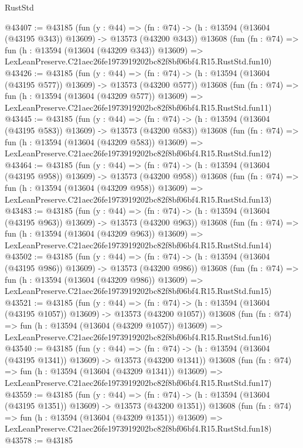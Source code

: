 \begin{lexlean}{RustStd}
\begin{coremodule}
@43407 := @43185
    (fun (y : @44) =>
    (fn : @74) -> (h : @13594 (@13604 (@43195 @343)) @13609) -> @13573 (@43200 @343))
    @13608
    (fun (fn : @74) =>
    fun (h : @13594 (@13604 (@43209 @343)) @13609) =>
    LexLeanPreserve.C21aec26fe1973919202bc82f8bf06bf4.R15.RustStd.fun10)
@43426 := @43185
    (fun (y : @44) =>
    (fn : @74) -> (h : @13594 (@13604 (@43195 @577)) @13609) -> @13573 (@43200 @577))
    @13608
    (fun (fn : @74) =>
    fun (h : @13594 (@13604 (@43209 @577)) @13609) =>
    LexLeanPreserve.C21aec26fe1973919202bc82f8bf06bf4.R15.RustStd.fun11)
@43445 := @43185
    (fun (y : @44) =>
    (fn : @74) -> (h : @13594 (@13604 (@43195 @583)) @13609) -> @13573 (@43200 @583))
    @13608
    (fun (fn : @74) =>
    fun (h : @13594 (@13604 (@43209 @583)) @13609) =>
    LexLeanPreserve.C21aec26fe1973919202bc82f8bf06bf4.R15.RustStd.fun12)
@43464 := @43185
    (fun (y : @44) =>
    (fn : @74) -> (h : @13594 (@13604 (@43195 @958)) @13609) -> @13573 (@43200 @958))
    @13608
    (fun (fn : @74) =>
    fun (h : @13594 (@13604 (@43209 @958)) @13609) =>
    LexLeanPreserve.C21aec26fe1973919202bc82f8bf06bf4.R15.RustStd.fun13)
@43483 := @43185
    (fun (y : @44) =>
    (fn : @74) -> (h : @13594 (@13604 (@43195 @963)) @13609) -> @13573 (@43200 @963))
    @13608
    (fun (fn : @74) =>
    fun (h : @13594 (@13604 (@43209 @963)) @13609) =>
    LexLeanPreserve.C21aec26fe1973919202bc82f8bf06bf4.R15.RustStd.fun14)
@43502 := @43185
    (fun (y : @44) =>
    (fn : @74) -> (h : @13594 (@13604 (@43195 @986)) @13609) -> @13573 (@43200 @986))
    @13608
    (fun (fn : @74) =>
    fun (h : @13594 (@13604 (@43209 @986)) @13609) =>
    LexLeanPreserve.C21aec26fe1973919202bc82f8bf06bf4.R15.RustStd.fun15)
@43521 := @43185
    (fun (y : @44) =>
    (fn : @74) -> (h : @13594 (@13604 (@43195 @1057)) @13609) -> @13573 (@43200 @1057))
    @13608
    (fun (fn : @74) =>
    fun (h : @13594 (@13604 (@43209 @1057)) @13609) =>
    LexLeanPreserve.C21aec26fe1973919202bc82f8bf06bf4.R15.RustStd.fun16)
@43540 := @43185
    (fun (y : @44) =>
    (fn : @74) -> (h : @13594 (@13604 (@43195 @1341)) @13609) -> @13573 (@43200 @1341))
    @13608
    (fun (fn : @74) =>
    fun (h : @13594 (@13604 (@43209 @1341)) @13609) =>
    LexLeanPreserve.C21aec26fe1973919202bc82f8bf06bf4.R15.RustStd.fun17)
@43559 := @43185
    (fun (y : @44) =>
    (fn : @74) -> (h : @13594 (@13604 (@43195 @1351)) @13609) -> @13573 (@43200 @1351))
    @13608
    (fun (fn : @74) =>
    fun (h : @13594 (@13604 (@43209 @1351)) @13609) =>
    LexLeanPreserve.C21aec26fe1973919202bc82f8bf06bf4.R15.RustStd.fun18)
@43578 := @43185

\end{coremodule}
\end{lexlean}
